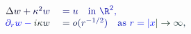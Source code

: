 \documentclass[12pt]{article}
\begin{document}
\makeatletter
\renewcommand*{\@textcolor}[3]{%
  \protect\leavevmode
  \begingroup
    \color#1{#2}#3%
  \endgroup
}
\makeatother
\begin{displaymath}
\begin{array} {rl} { \mathcolor[RGB]{0,0,15}{\Delta} \mathcolor[RGB]{0,0,30}{w} \mathcolor[RGB]{0,0,45}{+} \mathcolor[RGB]{0,0,60}{\kappa} ^ { \mathcolor[RGB]{0,0,75}{2} } \mathcolor[RGB]{0,0,90}{w} } & { { } \mathcolor[RGB]{0,0,105}{=} \mathcolor[RGB]{0,0,120}{u} \quad \mathrm { \mathcolor[RGB]{0,0,135}{i} \mathcolor[RGB]{0,0,150}{n} ~ } \mathcolor[RGB]{0,0,165}{\R} ^ { \mathcolor[RGB]{0,0,180}{2} } \mathcolor[RGB]{0,0,195}{,} } \\ { \mathcolor[RGB]{0,0,210}{\partial} _ { \mathcolor[RGB]{0,0,225}{r} } \mathcolor[RGB]{0,0,240}{w} \mathcolor[RGB]{0,0,255}{-} \mathcolor[RGB]{0,15,0}{i} \mathcolor[RGB]{0,15,15}{\kappa} \mathcolor[RGB]{0,15,30}{w} } & { { } \mathcolor[RGB]{0,15,45}{=} \mathcolor[RGB]{0,15,60}{o} \mathcolor[RGB]{0,15,75}{(} \mathcolor[RGB]{0,15,90}{r} ^ { \mathcolor[RGB]{0,15,105}{-} \mathcolor[RGB]{0,15,120}{1} \mathcolor[RGB]{0,15,135}{/} \mathcolor[RGB]{0,15,150}{2} } \mathcolor[RGB]{0,15,165}{)} \quad \mathrm { \mathcolor[RGB]{0,15,180}{a} \mathcolor[RGB]{0,15,195}{s} ~ } \mathcolor[RGB]{0,15,210}{r} \mathcolor[RGB]{0,15,225}{=} \mathcolor[RGB]{0,15,240}{|} \mathcolor[RGB]{0,15,255}{x} \mathcolor[RGB]{0,30,0}{|} \mathcolor[RGB]{0,30,15}{\to} \mathcolor[RGB]{0,30,30}{\infty} \mathcolor[RGB]{0,30,45}{,} } \end{array}
\end{displaymath}
\end{document}
